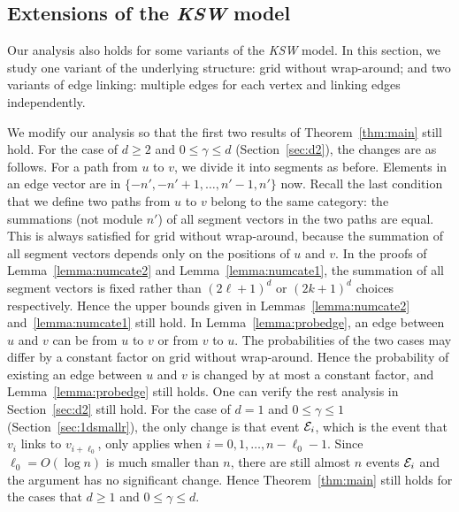 \documentclass[11pt]{article}
\def\KSW{{\it KSW }}
\begin{document}
\subsection{Extensions of the \KSW model} \label{sec:sworldextension}

Our analysis also holds for some variants of the \KSW model. In this section, we study one variant of the underlying structure: grid without wrap-around; and two variants of edge linking: multiple edges for each vertex and linking edges independently.

\vspace{\topsep}

 We modify our analysis so that the first two results of Theorem~\ref{thm:main} still hold. For the case of $d\geq2$ and $0\leq\gamma\leq d$ (Section~\ref{sec:d2}), the changes are as follows. For a path from $u$ to $v$, we divide it into segments as before. Elements in an edge vector are in $\{-n',-n'+1,\ldots,n'-1,n'\}$ now. Recall the last condition that we define two paths from $u$ to $v$ belong to the same category: the summations (not module $n'$) of all segment vectors in the two paths are equal. This is always satisfied for grid without wrap-around, because the summation of all segment vectors depends only on the positions of $u$ and $v$. In the proofs of Lemma~\ref{lemma:numcate2} and Lemma~\ref{lemma:numcate1}, the summation of all segment vectors is fixed rather than $(2\ell+1)^d$ or $(2k+1)^d$ choices respectively. Hence the upper bounds given in Lemmas~\ref{lemma:numcate2} and~\ref{lemma:numcate1} still hold. In Lemma~\ref{lemma:probedge}, an edge between $u$ and $v$ can be from $u$ to $v$ or from $v$ to $u$. The probabilities of the two cases may differ by a constant factor on grid without wrap-around. Hence the probability of existing an edge between $u$ and $v$ is changed by at most a constant factor, and Lemma~\ref{lemma:probedge} still holds. One can verify the rest analysis in Section~\ref{sec:d2} still hold. For the case of $d=1$ and $0\leq\gamma\leq1$ (Section~\ref{sec:1dsmallr}), the only change is that event  ${\cal E}_i$, which 
	is the event that $v_i$ links to $v_{i+\ell_0}$, only applies when
	$i=0,1,\ldots,n-\ell_0-1$. 
Since $\ell_0=O(\log n)$ is much smaller than $n$, there are still almost $n$ events ${\cal E}_i$ and the argument has no significant change. 
Hence Theorem~\ref{thm:main} still holds for the cases that $d\geq1$ and $0\leq\gamma\leq d$.

\vspace{\topsep}
\end{document}
